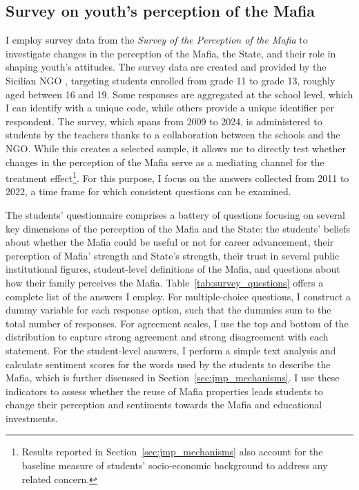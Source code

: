 \documentclass[12pt]{article}
\theoremstyle{plain}
\theoremstyle{plain}
\theoremstyle{plain}
\theoremstyle{definition}
\theoremstyle{plain}
\theoremstyle{definition}
\theoremstyle{plain}
\theoremstyle{remark}
\theoremstyle{definition}
\theoremstyle{definition}
\theoremstyle{plain}
\begin{document}
\subsection{Survey on youth's perception of the Mafia}
\label{sec:jmp_survey}
I employ survey data from the  \emph{Survey of the Perception of the Mafia} to investigate changes in the perception of the Mafia, the State, and their role in shaping youth's attitudes. The survey data are created and provided by the Sicilian NGO \citet{centro_studi_pio_la_torre_survey_2025}, targeting students enrolled from grade 11 to grade 13, roughly aged between 16 and 19. Some responses are aggregated at the school level, which I can identify with a unique code, while others provide a unique identifier per respondent. The survey, which spans from 2009 to 2024, is administered to students by the teachers thanks to a collaboration between the schools and the NGO. While this creates a selected sample, it allows me to directly test whether changes in the perception of the Mafia serve as a mediating channel for the treatment effect\footnote{Results reported in Section~\ref{sec:jmp_mechanisms} also account for the baseline measure of students' socio-economic background to address any related concern.}. For this purpose, I focus on the answers collected from 2011 to 2022, a time frame for which consistent questions can be examined. \par
The students' questionnaire comprises a battery of questions focusing on several key dimensions of the perception of the Mafia and the State: the students' beliefs about whether the Mafia could be useful or not for career advancement, their perception of Mafia' strength and State's strength, their trust in several public institutional figures, student-level definitions of the Mafia, and questions about how their family perceives the Mafia.
Table~\ref{tab:survey_questions} offers a complete list of the answers I employ. For multiple-choice questions, I construct a dummy variable for each response option, such that the dummies sum to the total number of responses. For agreement scales, I use the top and bottom of the distribution to capture strong agreement and strong disagreement with each statement. For the student-level answers, I perform a simple text analysis and calculate sentiment scores for the words used by the students to describe the Mafia, which is further discussed in Section~\ref{sec:jmp_mechanisms}. I use these indicators to assess whether the reuse of Mafia properties leads students to change their perception and sentiments towards the Mafia and educational investments.  
\end{document}
